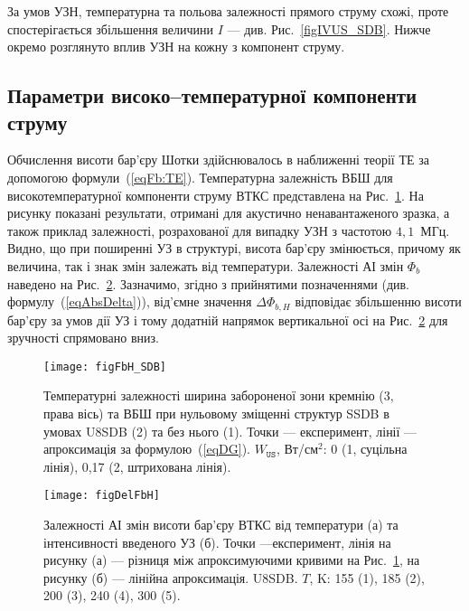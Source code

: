 \documentclass[a4paper,14pt,oneside,openany]{memoir}
\begin{document}
За умов УЗН, температурна та польова залежності прямого струму схожі,
проте спостерігається збільшення величини $I$ --- див. Рис.~\ref{figIVUS_SDB}.
Нижче окремо розглянуто вплив УЗН на кожну з компонент струму.


\subsection{Параметри високо--температурної компоненти струму}

Обчислення висоти бар'єру Шотки здійснювалось в наближенні теорії ТЕ за допомогою формули~(\ref{eqFb:TE}).
Температурна залежність ВБШ для високотемпературної компоненти струму ВТКС представлена на Рис.~\ref{figFbH_SDB}.
На рисунку показані результати, отримані для акустично ненавантаженого зразка,
а також приклад залежності, розрахованої для випадку УЗН з частотою $4,1$~МГц.
Видно, що при поширенні УЗ в структурі, висота бар'єру змінюється,
причому як величина, так і знак змін залежать від температури.
Залежності АІ змін $\Phi_{b}$ наведено на Рис.~\ref{figDelFbH}.
Зазначимо, згідно з прийнятими позначеннями (див. формулу~(\ref{eqAbsDelta})),
від'ємне значення $\Delta \Phi_{b,H}$ відповідає збільшенню висоти бар'єру за умов дії УЗ і тому
додатній напрямок вертикальної осі на Рис.~\ref{figDelFbH} для зручності спрямовано вниз.



\begin{figure}
\center
\texttt{[image: figFbH\_SDB]}
\caption{\label{figFbH_SDB}
Температурні залежності ширина забороненої зони кремнію (3, права вісь)
та ВБШ при нульовому зміщенні структур SSDB в умовах U8SDB (2) та без нього (1).
Точки --- експеримент,
лінії --- апроксимація за формулою~(\ref{eqDG}).
$W_\mathtt{US}$,  Вт/см$^2$: 0 (1, суцільна лінія), 0,17 (2, штрихована лінія).
}%
\end{figure}


\begin{figure}
\center
\texttt{[image: figDelFbH]}
\caption{\label{figDelFbH}
Залежності АІ змін висоти бар'єру ВТКС від температури (а) та інтенсивності введеного УЗ (б).
Точки ---експеримент,
лінія на рисунку (а) --- різниця між апроксимуючими кривими на Рис.~\ref{figFbH_SDB},
на рисунку (б) --- лінійна апроксимація.
U8SDB.
$T$, K: 155 (1), 185 (2), 200 (3), 240 (4), 300 (5).
}%
\end{figure}
\end{document}
